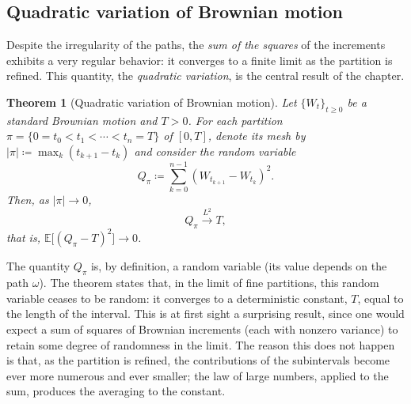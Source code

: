 \documentclass[11pt,a4paper,oneside]{report}
\theoremstyle{plain}
\newtheorem{teorema}{Theorem}[chapter]
\theoremstyle{definition}
\theoremstyle{remark}
\newcommand{\E}{\mathbb{E}}
\newcommand{\1}{\mathbf{1}}
\newcommand{\eqdef}{\coloneqq}
\begin{document}
\subsection{Quadratic variation of Brownian motion}
\label{subsec:variacion_cuadratica}

Despite the irregularity of the paths, the \emph{sum of the squares}
of the increments exhibits a very regular behavior: it converges
to a finite limit as the partition is refined. This quantity, the
\emph{quadratic variation}, is the central result of the chapter.

\medskip

\begin{teorema}[Quadratic variation of Brownian motion]
\label{teo:variacion_cuadratica}
Let $\{W_t\}_{t \geq 0}$ be a standard Brownian motion and $T > 0$.
For each partition $\pi = \{0 = t_0 < t_1 < \cdots < t_n = T\}$ of
$[0, T]$, denote its mesh by $|\pi| \eqdef \max_{k} (t_{k+1} - t_k)$
and consider the random variable
\begin{equation*}
  Q_\pi \eqdef \sum_{k=0}^{n-1} (W_{t_{k+1}} - W_{t_k})^2.
\end{equation*}
Then, as $|\pi| \to 0$,
\begin{equation}\label{eq:convergencia_var_cuadratica}
  Q_\pi \xrightarrow{L^2} T,
\end{equation}
that is, $\E\bigl[(Q_\pi - T)^2\bigr] \to 0$.
\end{teorema}

The quantity $Q_\pi$ is, by definition, a random variable (its value
depends on the path $\omega$). The theorem states that, in the limit
of fine partitions, this random variable ceases to be random: it
converges to a deterministic constant, $T$, equal to the length of the
interval. This is at first sight a surprising result, since one would
expect a sum of squares of Brownian increments (each with nonzero
variance) to retain some degree of randomness in the limit. The reason
this does not happen is that, as the partition is refined, the
contributions of the subintervals become ever more numerous and ever
smaller; the law of large numbers, applied to the sum, produces the
averaging to the constant.
\end{document}
